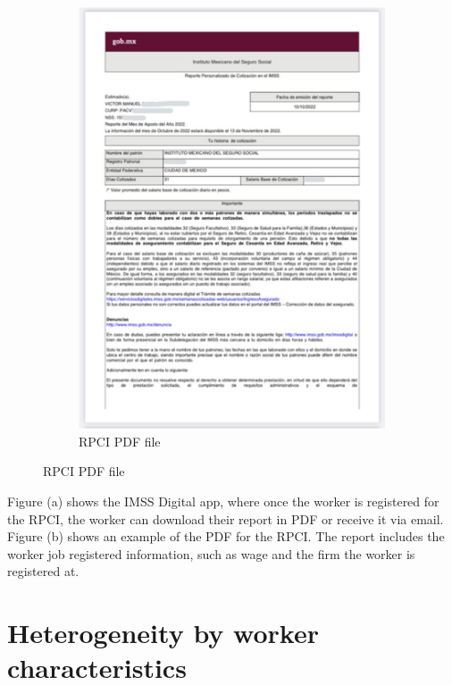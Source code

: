 \begin{figure}[H]
\begin{center}
\begin{subfigure}{0.49\textwidth}
    \end{subfigure}
    \begin{subfigure}{0.49\textwidth}
    \caption{RPCI PDF file}
    \includegraphics[width=\textwidth]{04_Figures/rpci_app/rpci_3.png}
    \end{subfigure}
    

    \end{center}
\end{figure}
\scriptsize{
\noindent Figure (a) shows the IMSS Digital app, where once the worker is registered for the RPCI, the worker can download their report in PDF or receive it via email. Figure (b) shows an example of the PDF for the RPCI. The report includes the worker job registered information, such as wage and the firm the worker is registered at.
}



\section{Heterogeneity by worker characteristics}

